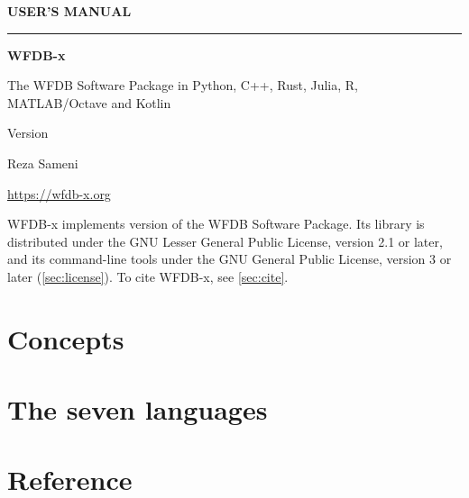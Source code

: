 \documentclass[11pt,a4paper,oneside,openany]{book}
\begin{document}
\begin{titlepage}
  \thispagestyle{empty}
  \vspace*{0.18\textheight}
  {\sffamily\color{accent}\large\bfseries USER'S MANUAL\par}
  \vspace{0.6em}
  {\color{accent}\rule{\linewidth}{1.2pt}\par}
  \vspace{1.0em}
  {\sffamily\bfseries\color{titlecolor}\fontsize{40}{44}\selectfont WFDB-x\par}
  \vspace{0.8em}
  {\sffamily\Large\color{titlecolor}The WFDB Software Package in Python, C++, Rust, Julia,
    R, MATLAB/Octave and Kotlin\par}
  \vspace{2.2em}
  {\sffamily\large\color{mutedtext}Version \wfdbxversion\quad\textbar\quad \wfdbxdate\par}
  \vfill
  {\sffamily\large\color{titlecolor}Reza Sameni\par}
  \vspace{0.3em}
  {\sffamily\small\color{mutedtext}\url{https://wfdb-x.org}\par}
  \vspace{1.2em}
  {\small\color{mutedtext}
  WFDB-x implements version \wfdbversion{} of the WFDB Software Package. Its library is
  distributed under the GNU Lesser General Public License, version 2.1 or later,
  and its command-line tools under the GNU General Public License, version 3 or
  later (\cref{sec:license}). To cite WFDB-x, see
  \cref{sec:cite}.\par}
\end{titlepage}

\frontmatter
\tableofcontents

\mainmatter

\part{Concepts}
\label{part:concepts}






\part{The seven languages}
\label{part:languages}








\part{Reference}
\label{part:reference}



\end{document}
